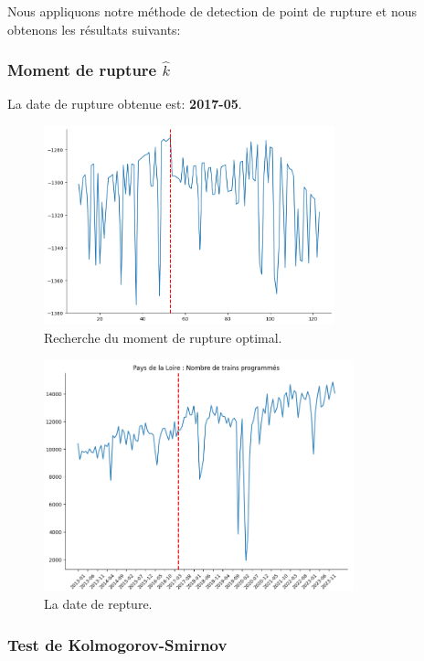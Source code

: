 {Nous appliquons notre méthode de detection de point de rupture et nous obtenons les résultats suivants:

\subsubsection{Moment de rupture $\hat{k}$}

La date de rupture obtenue est: \textbf{2017-05}. 


\begin{figure}[H]
\centering
\includegraphics[width=0.75\textwidth]{image/PL-FIG03.png} 
\caption{Recherche du moment de rupture optimal.}
\label{fig:trains_ANNULES_2}
\end{figure}


\begin{figure}[H]
\centering
\includegraphics[width=0.8\textwidth]{Loire_rupt.png} 
\caption{La date de repture.}
\label{fig:trains_programmes_2}
\end{figure}

\subsubsection{Test de Kolmogorov-Smirnov}

}
